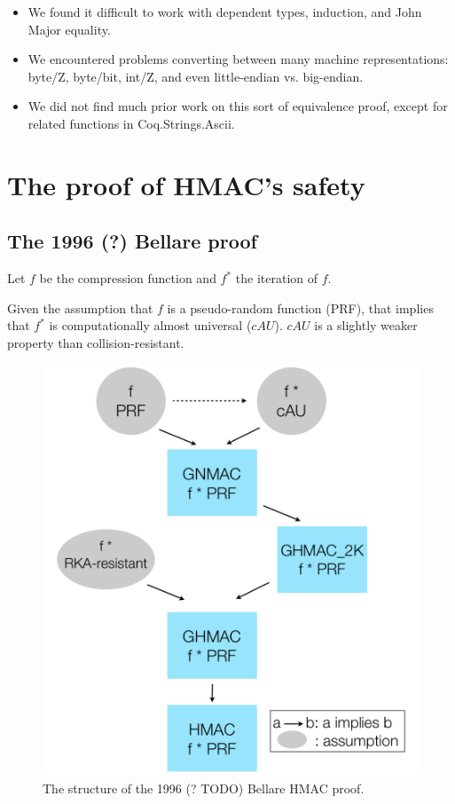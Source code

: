\documentclass[twocolumn,showpacs,%
  nofootinbib,aps,superscriptaddress,%
  eqsecnum,prd,notitlepage,showkeys,10pt]{revtex4-1}
\begin{document}
\begin{itemize}
\item We found it difficult to work with dependent types, induction, and John Major equality.
\item We encountered problems converting between many machine representations: byte/Z, byte/bit, int/Z, and even little-endian vs. big-endian.
\item We did not find much prior work on this sort of equivalence proof, except for related functions in Coq.Strings.Ascii.
\end{itemize}

\section{The proof of HMAC's safety}

\subsection{The 1996 (?) Bellare proof}

Let $f$ be the compression function and $f^*$ the iteration of $f$.

Given the assumption that $f$ is a pseudo-random function (PRF), that implies that $f^*$ is computationally almost universal ($cAU$). $cAU$ is a slightly weaker property than collision-resistant.

\begin{figure}[h!]
	\centering
	\includegraphics[scale=0.4]{HMAC_proof}
	\caption{The structure of the 1996 (? TODO) Bellare HMAC proof.}
\end{figure}
\end{document}
